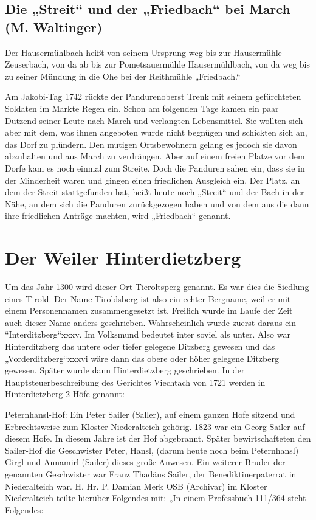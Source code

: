 \documentclass[12pt,a4pager]{book}
\begin{document}
\subsection{Die „Streit“ und der „Friedbach“ bei March (M. Waltinger)}

Der Hausermühlbach heißt von seinem Ursprung weg bis zur Hausermühle Zeuserbach,
von da ab bis zur Pometsauermühle Hausermühlbach, von da weg bis zu seiner
Mündung in die Ohe bei der Reithmühle „Friedbach.“

Am Jakobi-Tag 1742 rückte der Pandurenoberst Trenk mit seinem gefürchteten
Soldaten im Markte Regen ein. Schon am folgenden Tage kamen ein paar Dutzend
seiner Leute nach March und verlangten Lebensmittel. Sie wollten sich aber mit
dem, was ihnen angeboten wurde nicht begnügen und schickten sich an, das Dorf zu
plündern. Den mutigen Ortsbewohnern gelang es jedoch sie davon abzuhalten und
aus March zu verdrängen. Aber auf einem freien Platze vor dem Dorfe kam es noch
einmal zum Streite. Doch die Panduren sahen ein, dass sie in der Minderheit
waren und gingen einen friedlichen Ausgleich ein. Der Platz, an dem der Streit
stattgefunden hat, heißt heute noch „Streit“ und der Bach in der Nähe, an dem
sich die Panduren zurückgezogen haben und von dem aus die dann ihre friedlichen
Anträge machten, wird „Friedbach“ genannt.

\section{Der Weiler Hinterdietzberg}

Um das Jahr 1300 wird dieser Ort Tieroltsperg genannt. Es war dies die Siedlung
eines Tirold. Der Name Tiroldsberg ist also ein echter Bergname, weil er mit
einem Personennamen zusammengesetzt ist. Freilich wurde im Laufe der Zeit auch
dieser Name anders geschrieben. Wahrscheinlich wurde zuerst daraus ein
“Interditzberg“xxxv. Im Volksmund bedeutet inter soviel als unter. Also war
Hinterditzberg das untere oder tiefer gelegene Ditzberg gewesen und das
„Vorderditzberg“xxxvi wäre dann das obere oder höher gelegene Ditzberg gewesen.
Später wurde dann Hinterdietzberg geschrieben. In der Hauptsteuerbeschreibung
des Gerichtes Viechtach von 1721 werden in Hinterdietzberg 2 Höfe genannt:

Peternhansl-Hof: Ein Peter Sailer (Saller), auf einem ganzen Hofe sitzend und
Erbrechtsweise zum Kloster Niederalteich gehörig. 1823 war ein Georg Sailer auf
diesem Hofe. In diesem Jahre ist der Hof abgebrannt. Später bewirtschafteten den
Sailer-Hof die Geschwister Peter, Hansl, (darum heute noch beim Peternhansl)
Girgl und Annamirl (Sailer) dieses große Anwesen. Ein weiterer Bruder der
genannten Geschwister war Franz Thadäus Sailer, der Benediktinerpaterrat in
Niederalteich war. H. Hr. P. Damian Merk OSB (Archivar) im Kloster Niederalteich
teilte hierüber Folgendes mit: „In einem Professbuch 111/364 steht Folgendes:
\end{document}
